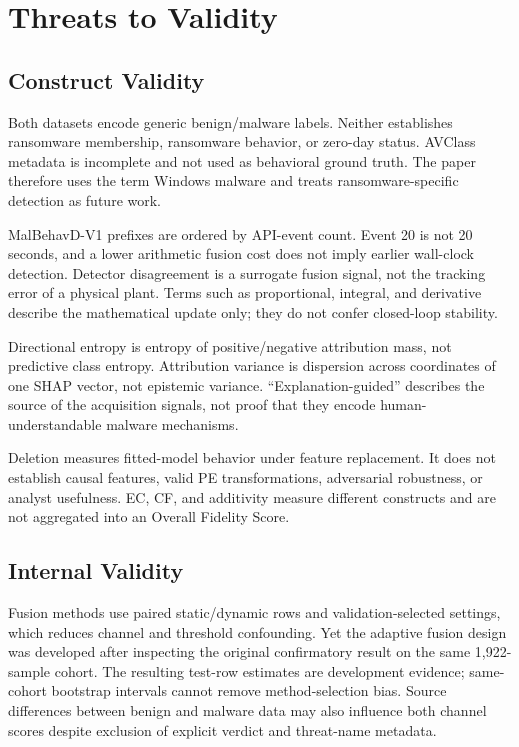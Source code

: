 \section{Threats to Validity}
\label{sec:threats}

\subsection{Construct Validity}

Both datasets encode generic benign/malware labels. Neither establishes
ransomware membership, ransomware behavior, or zero-day status. AVClass metadata
is incomplete and not used as behavioral ground truth. The paper therefore uses
the term Windows malware and treats ransomware-specific detection as future
work.

MalBehavD-V1 prefixes are ordered by API-event count. Event 20 is not 20 seconds,
and a lower arithmetic fusion cost does not imply earlier wall-clock detection.
Detector disagreement is a surrogate fusion signal, not the tracking error of a
physical plant. Terms such as proportional, integral, and derivative describe
the mathematical update only; they do not confer closed-loop stability.

Directional entropy is entropy of positive/negative attribution mass, not
predictive class entropy. Attribution variance is dispersion across coordinates
of one SHAP vector, not epistemic variance. “Explanation-guided” describes the
source of the acquisition signals, not proof that they encode human-understandable
malware mechanisms.

Deletion measures fitted-model behavior under feature replacement. It does not
establish causal features, valid PE transformations, adversarial robustness, or
analyst usefulness. EC, CF, and additivity measure different constructs and are
not aggregated into an Overall Fidelity Score.

\subsection{Internal Validity}

Fusion methods use paired static/dynamic rows and validation-selected settings,
which reduces channel and threshold confounding. Yet the adaptive fusion design
was developed after inspecting the original confirmatory result on the same
1,922-sample cohort. The resulting test-row estimates are development evidence;
same-cohort bootstrap intervals cannot remove method-selection bias. Source
differences between benign and malware data may also influence both channel
scores despite exclusion of explicit verdict and threat-name metadata.

